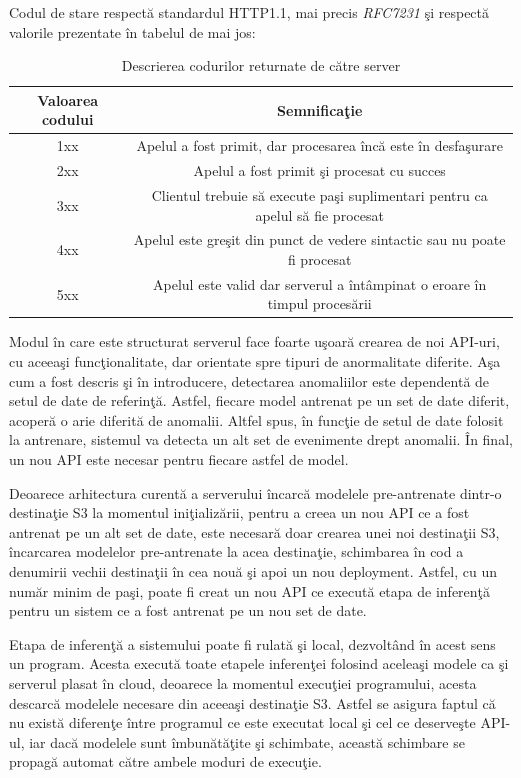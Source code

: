 \documentclass[a4paper,12pt]{report}
\begin{document}
\par Codul de stare respectă standardul HTTP1.1, mai precis \emph{RFC7231}\cite{RFC7231} şi respectă valorile prezentate în tabelul de mai jos: 
\begin{table}[h]
\begin{tabular}{|c|c|}
\hline
Valoarea codului & Semnificaţie                                                                   \\
\hline
1xx   & Apelul a fost primit, dar procesarea încă este în desfaşurare                  \\
\hline
2xx   & Apelul a fost primit şi procesat cu succes                                     \\
\hline
3xx   & Clientul trebuie să execute paşi suplimentari pentru ca apelul să fie procesat \\
\hline
4xx   & Apelul este greşit din punct de vedere sintactic sau nu poate fi procesat      \\
\hline
5xx   & Apelul este valid dar serverul a întâmpinat o eroare în timpul procesării   \\
\hline   
\end{tabular}
\caption{Descrierea codurilor returnate de către server}
\end{table}
\par Modul în care este structurat serverul face foarte uşoară crearea de noi API-uri, cu aceeaşi funcţionalitate, dar orientate spre tipuri de anormalitate diferite. Aşa cum a fost descris şi în introducere, detectarea anomaliilor este dependentă de setul de date de referinţă. Astfel, fiecare model antrenat pe un set de date diferit, acoperă o arie diferită de anomalii. Altfel spus, în funcţie de setul de date folosit la antrenare, sistemul va detecta un alt set de evenimente drept anomalii. În final, un nou API este necesar pentru fiecare astfel de model. 
\par Deoarece arhitectura curentă a serverului încarcă modelele pre-antrenate dintr-o destinaţie S3 la momentul iniţializării, pentru a creea un nou API ce a fost antrenat pe un alt set de date, este necesară doar crearea unei noi destinaţii S3, încarcarea modelelor pre-antrenate la acea destinaţie, schimbarea în cod a denumirii vechii destinaţii în cea nouă şi apoi un nou deployment. Astfel, cu un număr minim de paşi, poate fi creat un nou API ce execută etapa de inferenţă pentru un sistem ce a fost antrenat pe un nou set de date. \\

\par Etapa de inferenţă a sistemului poate fi rulată şi local, dezvoltând în acest sens un program. Acesta execută toate etapele inferenţei folosind aceleaşi modele ca şi serverul plasat în cloud, deoarece la momentul execuţiei programului, acesta descarcă modelele necesare din aceeaşi destinaţie S3. Astfel se asigura faptul că nu există diferenţe între programul ce este executat local şi cel ce deserveşte API-ul, iar dacă modelele sunt îmbunătăţite şi schimbate, această schimbare se propagă automat către ambele moduri de execuţie.
\end{document}
